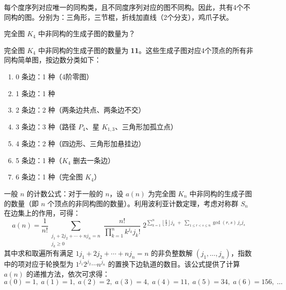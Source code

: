 \documentclass[lang=cn,11pt]{elegantbook}
\begin{document}
每个度序列对应唯一的同构类，且不同度序列对应的图不同构。因此，共有4个不同构的图。分别为：三角形，三节棍，折线加直线（2个分支），鸡爪子状。

\begin{example}
    完全图 $K_4$ 中非同构的生成子图的数量为？
\end{example}
完全图 $K_4$ 中非同构的生成子图的数量为 \textbf{11}。这些生成子图对应4个顶点的所有非同构简单图，按边数分类如下：
\begin{enumerate}
    \item 0 条边：1 种（4阶零图）
    \item 1 条边：1 种
    \item 2 条边：2 种（两条边共点、两条边不交）
    \item 3 条边：3 种（路径 $P_4$、星 $K_{1,3}$、三角形加孤立点）
    \item 4 条边：2 种（四边形、三角形加悬挂边）
    \item 5 条边：1 种（$K_4$ 删去一条边）
    \item 6 条边：1 种（完全图 $K_4$）
\end{enumerate}
一般 $n$ 的计数公式：对于一般的 $n$，设 $a(n)$ 为完全图 $K_n$ 中非同构的生成子图的数量（即 $n$ 个顶点的非同构图的数量）。利用波利亚计数定理，考虑对称群 $S_n$ 在边集上的作用，可得：
\[
a(n) = \frac{1}{n!} \sum_{\substack{j_1 + 2j_2 + \cdots + n j_n = n \\ j_k \ge 0}} 
\frac{n!}{\prod_{k=1}^n k^{j_k} j_k!} \; 
2^{\sum_{k=1}^n \left\lfloor \frac{k}{2} \right\rfloor j_k \;+\; 
\sum_{1 \le r < s \le n} \gcd(r, s) \, j_r j_s}
\]
其中求和取遍所有满足 $1j_1 + 2j_2 + \cdots + n j_n = n$ 的非负整数解 $(j_1, \ldots, j_n)$，指数中的项对应于轮换型为 $1^{j_1}2^{j_2}\cdots n^{j_n}$ 的置换下边轨道的数目。该公式提供了计算 $a(n)$ 的递推方法，依次可求得：
\[
a(0)=1,\; a(1)=1,\; a(2)=2,\; a(3)=4,\; a(4)=11,\; a(5)=34,\; a(6)=156,\; \ldots
\]
\end{document}
